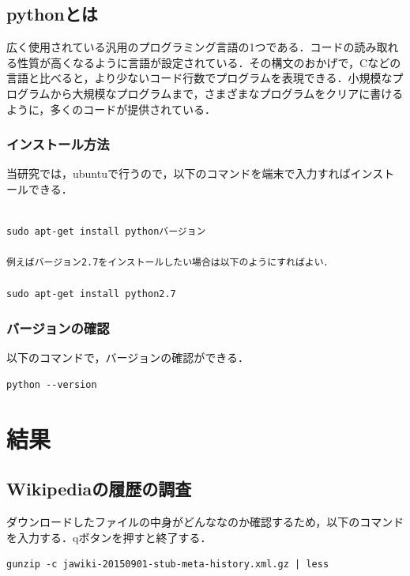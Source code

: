 \section{pythonとは}

広く使用されている汎用のプログラミング言語の1つである．コードの読み取れる性質が高くなるように言語が設定されている．その構文のおかげで，Cなどの言語と比べると，より少ないコード行数でプログラムを表現できる．小規模なプログラムから大規模なプログラムまで，さまざまなプログラムをクリアに書けるように，多くのコードが提供されている．

\subsection{インストール方法}

当研究では，ubuntuで行うので，以下のコマンドを端末で入力すればインストールできる．

{\small
\begin{verbatim}

sudo apt-get install pythonバージョン

例えばバージョン2.7をインストールしたい場合は以下のようにすればよい．

sudo apt-get install python2.7
\end{verbatim}}


\subsection{バージョンの確認}

以下のコマンドで，バージョンの確認ができる．


{\small
\begin{verbatim}
python --version
\end{verbatim}}




\chapter{結果}



\section{Wikipediaの履歴の調査}



ダウンロードしたファイルの中身がどんななのか確認するため，以下のコマンドを入力する．qボタンを押すと終了する．
{\small
\begin{verbatim}
gunzip -c jawiki-20150901-stub-meta-history.xml.gz | less
\end{verbatim}}

